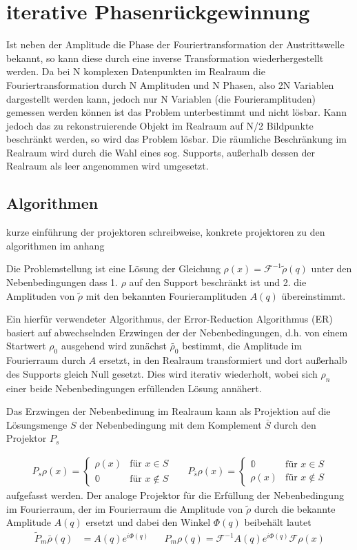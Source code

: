 \section{iterative Phasenrückgewinnung}
Ist neben der Amplitude die Phase der Fouriertransformation der Austrittswelle bekannt, so kann diese durch eine inverse Transformation wiederhergestellt werden. 
Da bei N komplexen Datenpunkten im Realraum die Fouriertransformation durch N Amplituden und N Phasen, also 2N Variablen dargestellt werden kann, jedoch nur N Variablen (die Fourieramplituden) gemessen werden können ist das Problem unterbestimmt und nicht lösbar. Kann jedoch das zu rekonstruierende Objekt im Realraum auf N/2 Bildpunkte beschränkt werden, so wird das Problem lösbar. Die räumliche Beschränkung im Realraum wird 
durch die Wahl eines sog. Supports, außerhalb dessen der Realraum als leer angenommen wird umgesetzt.  
\subsection{Algorithmen}
kurze einführung der projektoren schreibweise, konkrete projektoren zu den algorithmen im anhang

Die Problemstellung ist eine Lösung der Gleichung $\rho(x)=\mathscr{F}^{-1}\tilde{\rho}(q)$ unter den Nebenbedingungen dass 1. $\rho$ auf den Support beschränkt ist und 2. die Amplituden von $\tilde{\rho}$ mit den bekannten Fourieramplituden $A(q)$ übereinstimmt.

Ein hierfür verwendeter Algorithmus, der Error-Reduction Algorithmus (ER) basiert auf abwechselnden Erzwingen der der Nebenbedingungen, d.h. von einem Startwert $\rho_0$ ausgehend wird zunächst $\tilde{\rho_0}$ bestimmt, die Amplitude im Fourierraum durch $A$ ersetzt, in den Realraum transformiert und dort außerhalb des Supports gleich Null gesetzt. Dies wird iterativ wiederholt, wobei sich $\rho_n$ einer beide Nebenbedingungen erfüllenden Lösung annähert.

Das Erzwingen der Nebenbedinung im Realraum kann als Projektion auf die Lösungsmenge $S$ der Nebenbedingung  mit dem Komplement $\bar{S}$ durch den Projektor $P_s$ 

 \begin{align}
 P_s\rho (x)=\begin{cases}
 \rho (x)  &\text{für } x\in S\\
 \mathbb{0}  &\text{für }x\notin S
 \end{cases}&&
 P_{\bar{s}}\rho (x)=\begin{cases}
 \mathbb{0} &\text{für } x\in S\\
 \rho (x)   &\text{für }x\notin S
 \end{cases}
 \end{align}
aufgefasst werden. Der analoge Projektor für die Erfüllung der Nebenbedingung im Fourierraum, der im Fourierraum die Amplitude von $\tilde{\rho}$ durch die bekannte Amplitude $A(q)$ ersetzt und dabei den Winkel $\Phi(q)$ beibehält lautet
\begin{align}
	\tilde{P}_m \bar{\rho}(q)&=A(q)e^{i\Phi(q)} &&P_m\rho(q)=\mathscr{F}^{-1}A(q)e^{i\Phi(q)}\mathscr{F}\rho(x)
\end{align}

